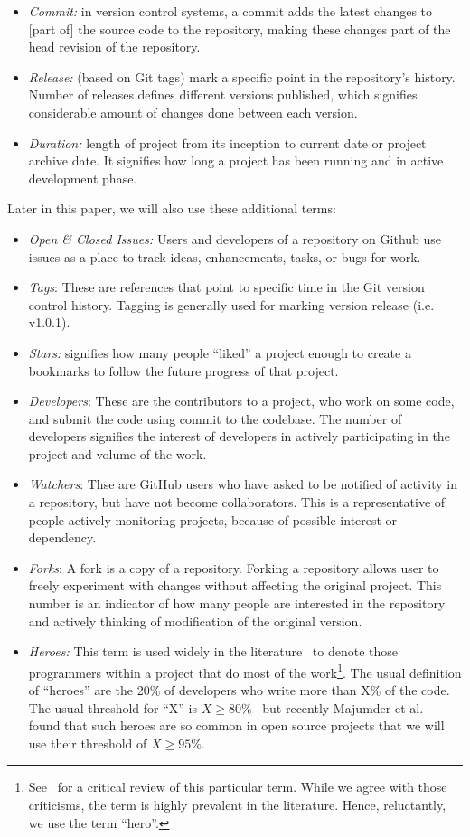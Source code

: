 \documentclass[sigconf,review,anonymous]{acmart}
\newcommand{\bi}{\begin{itemize}}
\newcommand{\ei}{\end{itemize}}
\begin{document}
\bi
\item \textit{Commit:} in version control systems, a commit adds the latest changes to [part of] the source code to the repository, making these changes part of the head revision of the repository. 
    \item \textit{Release:} (based on Git tags) mark a specific point in the repository’s history. Number of releases defines different versions published, which signifies considerable amount of changes done between each version.
    \item \textit{Duration:} length of project from its inception to current date or project archive date. It signifies how long a project has been running and in active development phase.
    \ei
    Later in this
    paper, we will also use these additional terms:
    \bi
    \item \textit{Open \& Closed Issues:} Users and developers of a repository on Github use issues as a place to  track ideas, enhancements, tasks, or bugs for work. 
     \item \textit{Tags}: These are references that point to specific time in the Git version control history. Tagging is generally used for marking version release (i.e. v1.0.1).
    \item \textit{Stars:} signifies how many people
    ``liked'' a project enough to create a   bookmarks to follow the future progress of that project.
    \item  \textit{Developers}: These are the contributors to a project, who work on some code, and submit the code using commit to the codebase. The number of developers signifies the interest of developers in actively participating in the project and volume of the work.
     \item  \textit{Watchers}: Thse are GitHub users who have asked to be notified of activity in a repository, but have not become collaborators. This is a representative of people actively monitoring projects, because of possible interest or dependency.
     \item \textit{Forks}: A fork is a copy of a repository. Forking a repository allows user to freely experiment with changes without affecting the original project. This number
    is an indicator of how many people are interested in the repository and actively thinking
    of modification of the original version.
  
    
   
    
    \item
    {\em Heroes:} This term is used widely in the literature~\cite{agrawal2018we, goeminne2011evidence, torres2011analysis, robles2009evolution} to denote
those programmers within a project that do most of the work\footnote{ See~\cite{claburn2020_heroes}
  for a critical review of this particular term. While  we agree with those criticisms, the term is highly prevalent in the literature. Hence, reluctantly, we use the 
  term ``hero''.}. The usual definition of ``heroes'' are the 20\% of developers who write more than X\% of the code.
  The usual threshold for ``X'' is $X\ge 80\%$~\cite{robles2009evolution} but recently
  Majumder et al.~\cite{majumder19_heroes} found that such heroes are so common in open source projects that we
 will use their threshold of $X\ge 95\%$. 
\ei
\end{document}
